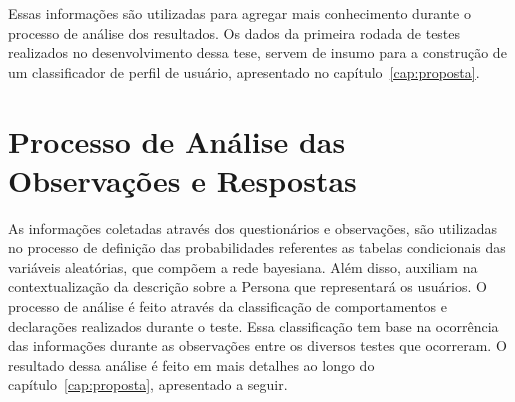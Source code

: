 Essas informações são utilizadas para agregar mais conhecimento durante o processo de análise dos resultados. Os dados da primeira rodada de testes realizados no desenvolvimento dessa tese, servem de insumo para a construção de um classificador de perfil de usuário, apresentado no capítulo~\ref{cap:proposta}.

\section{Processo de Análise das Observações e Respostas}
\label{sec:analise}
As informações coletadas através dos questionários e observações, são utilizadas no processo de definição das probabilidades referentes as tabelas condicionais das variáveis aleatórias, que compõem a rede bayesiana. Além disso, auxiliam na contextualização da descrição sobre a Persona que representará os usuários. O processo de análise é feito através da classificação de comportamentos e declarações realizados durante o teste. Essa classificação tem base na ocorrência das informações durante as observações entre os diversos testes que ocorreram. O resultado dessa análise é feito em mais detalhes ao longo do capítulo~\ref{cap:proposta}, apresentado a seguir.
